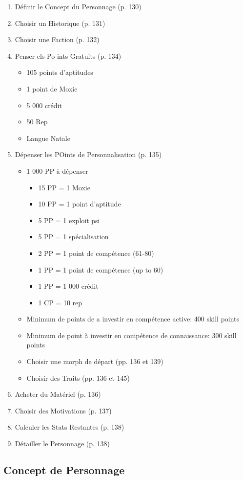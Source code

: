 \begin{enumerate} \item Définir le Concept du Personnage (p. 130) \item Choisir un Historique (p. 131) \item Choisir une Faction (p. 132) \item Penser els Po ints Gratuits (p. 134) \begin{itemize} \item 105 points d'aptitudes \item 1 point de Moxie \item 5 000 crédit \item 50 Rep \item Langue Natale\end{itemize} \item Dépenser les POints de Personnalisation (p. 135) \begin{itemize} \item 1 000 PP à dépenser\begin{itemize} \item 15 PP = 1 Moxie \item 10 PP = 1 point d'aptitude \item 5 PP = 1 exploit psi \item 5 PP = 1 spécialisation \item 2 PP = 1 point de compétence (61-80) \item 1 PP = 1 point de compétence (up to 60) \item 1 PP = 1 000 crédit \item 1 CP = 10 rep \end{itemize} \item Minimum de points de a investir en compétence active: 400 skill points \item Minimum de point à investir en compétence de connaissance: 300 skill points \item Choisir une morph de départ (pp. 136 et 139) \item Choisir des Traits (pp. 136 et 145) \end{itemize} \item Acheter du Matériel (p. 136) \item Choisir des Motivations (p. 137) \item Calculer les Stats Restantes (p. 138) \item Détailler le Personnage (p. 138) \end{enumerate} 

\subsection{Concept de Personnage} \label{character-concept} 

